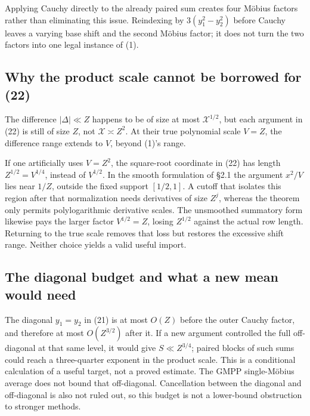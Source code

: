 Applying Cauchy directly to the already paired sum creates four Möbius
factors rather than eliminating this issue. Reindexing by
\(3(y_1^2-y_2^2)\) before Cauchy leaves a varying base shift and the
second Möbius factor; it does not turn the two factors into one legal
instance of (1).

\subsection{Why the product scale cannot be borrowed for
(22)}\label{why-the-product-scale-cannot-be-borrowed-for-22}

The difference \(|\Delta|\ll Z\) happens to be of size at most
\(\mathcal X^{1/2}\), but each argument in (22) is still of size \(Z\),
not \(\mathcal X\asymp Z^2\). At their true polynomial scale \(V=Z\),
the difference range extends to \(V\), beyond (1)'s range.

If one artificially uses \(V=Z^2\), the square-root coordinate in (22)
has length \(Z^{1/2}=V^{1/4}\), instead of \(V^{1/2}\). In the smooth
formulation of §2.1 the argument \(x^2/V\) lies near \(1/Z\), outside
the fixed support \([1/2,1]\). A cutoff that isolates this region after
that normalization needs derivatives of size \(Z^j\), whereas the
theorem only permits polylogarithmic derivative scales. The unsmoothed
summatory form likewise pays the larger factor \(V^{1/2}=Z\), losing
\(Z^{1/2}\) against the actual row length. Returning to the true scale
removes that loss but restores the excessive shift range. Neither choice
yields a valid useful import.

\subsection{The diagonal budget and what a new mean would
need}\label{the-diagonal-budget-and-what-a-genuinely-new-mean-would-need}

The diagonal \(y_1=y_2\) in (21) is at most \(O(Z)\) before the outer
Cauchy factor, and therefore at most \(O(Z^{3/2})\) after it. If a new
argument controlled the full off-diagonal at that same level, it would
give \(S\ll Z^{3/4}\); paired blocks of such sums could reach a
three-quarter exponent in the product scale. This is a conditional
calculation of a useful target, not a proved estimate. The
GMPP single-Möbius average does not bound that off-diagonal.
Cancellation between the diagonal and off-diagonal is also not ruled
out, so this budget is not a lower-bound obstruction to stronger
methods.

